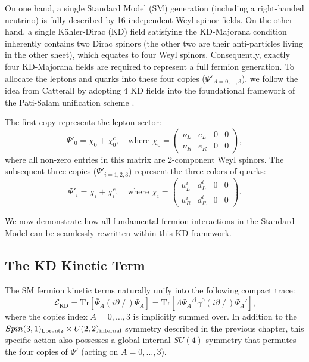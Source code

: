 On one hand, a single Standard Model (SM) generation (including a right-handed neutrino) is fully described by 16 independent Weyl spinor fields. On the other hand, a single Kähler-Dirac (KD) field satisfying the KD-Majorana condition inherently contains two Dirac spinors (the other two are their anti-particles living in the other sheet), which equates to four Weyl spinors. Consequently, exactly four KD-Majorana fields are required to represent a full fermion generation. To allocate the leptons and quarks into these four copies ($\Psi'_{\!A=0,\ldots,3}$), we follow the idea from Catterall \cite{Catterall:2023nww} by adopting 4 KD fields into the foundational framework of the Pati-Salam unification scheme \cite{Pati:1974yy}.

The first copy represents the lepton sector: 
\begin{equation}\label{eq:Psi_leptons}
  \Psi'_{0}=\chi_{0}+\chi_{0}^{c},\quad \text{where } \chi_{0}=\left(\begin{array}{cccc}
    \nu_{L} & e_{L} & 0 & 0 \\
    \nu_{R} & e_{R} & 0 & 0 \end{array}\right),
\end{equation} 
where all non-zero entries in this matrix are 2-component Weyl spinors. The subsequent three copies ($\Psi'_{i=1,2,3}$) represent the three colors of quarks:
 \begin{equation}\label{eq:Psi_quarks}
   \Psi'_{i}=\chi_{i}+\chi_{i}^{c},\quad \text{where }\chi_{i}=\left(\begin{array}{cccc}
    u_{L}^{i} & d_{L}^{i} & 0 & 0 \\
    u_{R}^{i} & d_{R}^{i} & 0 & 0 \end{array}\right).
 \end{equation}

We now demonstrate how all fundamental fermion interactions in the Standard Model can be seamlessly rewritten within this KD framework.

\subsection{The KD Kinetic Term}

The SM fermion kinetic terms naturally unify into the following compact trace:
\begin{equation}
    \mathcal{L}_{\text{KD}} = \text{Tr}[\bar{\Psi}_{\!A}(i\partial\!\!\!\!\;\!/\,)\Psi_{\!A}]=
    \text{Tr}[\Lambda \Psi_{\!A}'^{\dagger}\gamma^{0}(i\partial\!\!\!\!\;\!/\,)\Psi_{\!A}'],
\end{equation}
where the copies index $A=0,\ldots,3$ is implicitly summed over. In addition to the $Spin(3,1)_{{\rm Lorentz}}\times U(2,2)_{{\rm internal}}$ symmetry described in the previous chapter, this specific action also possesses a global internal $SU(4)$ symmetry that permutes the four copies of $\Psi'$ (acting on $A=0,\ldots,3$). 


